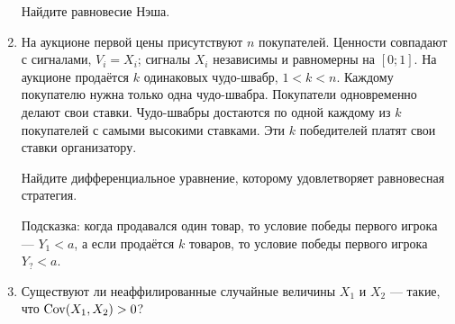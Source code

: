 \begin{enumerate}
Найдите равновесие Нэша.

\item На аукционе первой цены присутствуют $ n $ покупателей. Ценности совпадают с сигналами, $ V_{i}=X_{i} $; сигналы $ X_{i} $ независимы и равномерны на $ [0;1] $. На аукционе продаётся $k$ одинаковых чудо-швабр, $ 1<k<n $. Каждому покупателю нужна только одна чудо-швабра. Покупатели одновременно делают свои ставки. Чудо-швабры достаются по одной каждому из $ k $ покупателей с самыми высокими ставками. Эти $ k $ победителей платят свои ставки организатору.

Найдите дифференциальное уравнение, которому удовлетворяет равновесная стратегия.

Подсказка: когда продавался один товар, то условие победы первого игрока — $ Y_{1}<a $, а если продаётся $ k $ товаров, то условие победы первого игрока $ Y_{?}<a $.

\item Существуют ли неаффилированные случайные величины $ X_{1} $ и $ X_{2} $ — такие, что $\operatorname{Cov}(X_{1},X_{2})>0  $? 

\end{enumerate}
